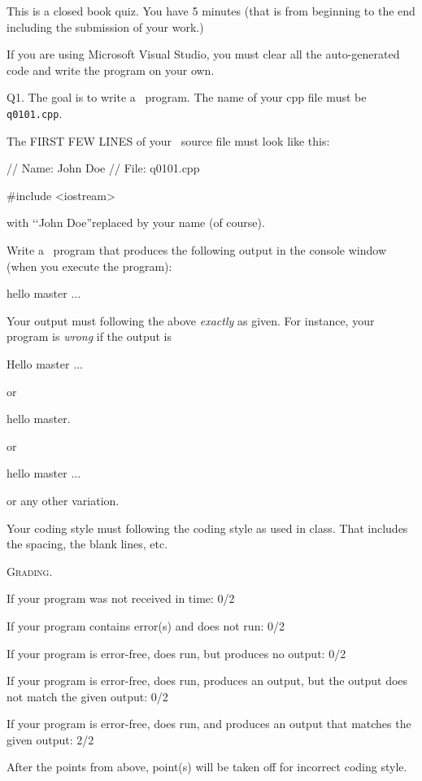 


\renewcommand\TITLE{Quiz q0101}


\topmatter

This is a closed book quiz. 
You have 5 minutes (that is from beginning to the end including
the submission of your work.)

If you are using Microsoft Visual Studio, you must clear all the
auto-generated code and write the program on your own.

Q1. The goal is to write a \cpp\ program.
The name of your cpp file must be \verb!q0101.cpp!.

The FIRST FEW LINES of your \cpp\ source file must look like this:
\begin{console}
// Name: John Doe
// File: q0101.cpp

#include <iostream>
\end{console}
with \lq\lq John Doe''replaced by your name (of course).

Write a \cpp\ program that produces the following output in the console
window (when you execute the program):
\begin{console}
hello master ...
\end{console}
Your output must following the above \textit{exactly} as given.
For instance,
your program is \textit{wrong} if the output is
\begin{console}
Hello master ...
\end{console}
or
\begin{console}
hello master.
\end{console}
or
\begin{console}
hello    master ...
\end{console}
or any other variation.

Your coding style must following the coding style as used in class.
That includes the spacing, the blank lines, etc.

\textsc{Grading.}
\begin{tightlist}
\item If your program was not received in time: 0/2
\item If your program contains error(s) and does not run: 0/2
\item If your program is error-free, does run, but produces no output: 0/2
\item If your program is error-free, does run, produces an output, but the output does not match the given output: 0/2
\item If your program is error-free, does run, and produces an output that matches
the given output: 2/2
\item After the points from above,
point(s) will be taken off for incorrect coding style.
\end{tightlist}

